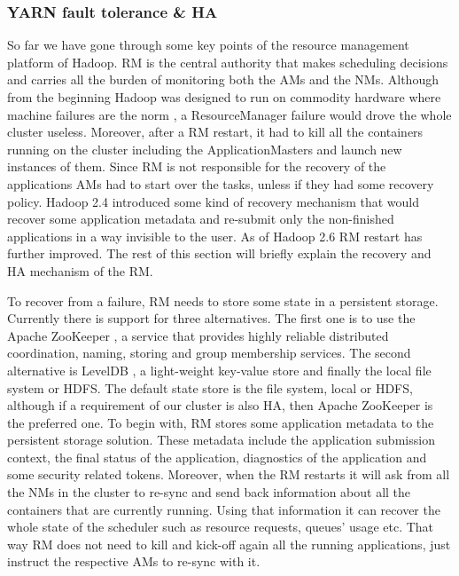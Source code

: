 \subsubsection{YARN fault tolerance \& HA}
\label{sssec:yarn_ha}
So far we have gone through some key points of the resource management
platform of Hadoop. RM is the central authority that makes scheduling
decisions and carries all the burden of monitoring both the AMs and
the NMs. Although from the beginning Hadoop was designed to run on
commodity hardware where machine failures are the norm
\cite{doi:10.2200/S00516ED2V01Y201306CAC024, Dean:2013:TS:2408776.2408794}, a
ResourceManager failure would drove the whole cluster
useless. Moreover, after a RM restart, it had to kill all the
containers running on the cluster including the ApplicationMasters and
launch new instances of them. Since RM is not responsible for the
recovery of the applications AMs had to start over the tasks, unless if
they had some recovery policy. Hadoop 2.4 introduced some kind of recovery mechanism that would
recover some application metadata and re-submit only the non-finished
applications in a way invisible to the user. As of Hadoop 2.6 RM
restart has further improved. The rest of this section will briefly
explain the recovery and HA mechanism of the RM.

To recover from a failure, RM needs to
store some state in a persistent storage. Currently there is support
for three alternatives. The first one is to use the Apache ZooKeeper
\cite{Hunt:2010:ZWC:1855840.1855851}, a service that provides highly reliable
distributed coordination, naming, storing and group membership
services. The second alternative is LevelDB \cite{google_leveldb},
a light-weight key-value store and finally the local file system or
HDFS. The default state store is the file system, local or HDFS, although
if a requirement of our cluster is also HA, then Apache ZooKeeper is
the preferred one. To begin with, RM stores some application metadata to
the persistent storage solution. These metadata include the
application submission context, the final status of the application,
diagnostics of the application and some security related
tokens. Moreover, when the RM restarts it will ask from all the NMs in
the cluster to re-sync and send back information about all the
containers that are currently running. Using that information it can
recover the whole state of the scheduler such as resource requests,
queues' usage etc. That way RM does not need to kill and kick-off again all
the running applications, just instruct the respective AMs to re-sync
with it.

